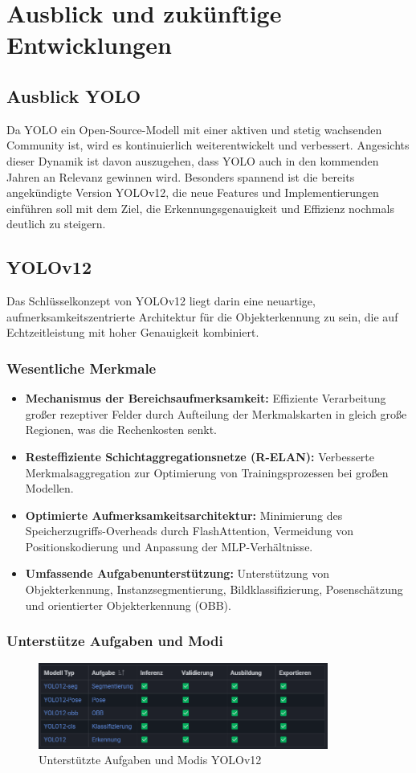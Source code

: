 \section{Ausblick und zukünftige Entwicklungen}
\subsection{Ausblick YOLO}
Da YOLO ein Open-Source-Modell mit einer aktiven und stetig wachsenden Community ist, wird es kontinuierlich weiterentwickelt und verbessert. Angesichts dieser Dynamik ist davon auszugehen, dass YOLO auch in den kommenden Jahren an Relevanz gewinnen wird. Besonders spannend ist die bereits angekündigte Version YOLOv12, die neue Features und Implementierungen einführen soll mit dem Ziel, die Erkennungsgenauigkeit und Effizienz nochmals deutlich zu steigern.
\subsection{YOLOv12}
Das Schlüsselkonzept von YOLOv12 liegt darin eine neuartige, aufmerksamkeitszentrierte Architektur für die Objekterkennung zu sein, die auf Echtzeitleistung mit hoher Genauigkeit kombiniert. \cite{Jocher2025YOLO12}
\subsubsection{Wesentliche Merkmale}
\begin{itemize}
    \item \textbf{Mechanismus der Bereichsaufmerksamkeit:} Effiziente Verarbeitung großer rezeptiver Felder durch Aufteilung der Merkmalskarten in gleich große Regionen, was die Rechenkosten senkt.
    \item \textbf{Resteffiziente Schichtaggregationsnetze (R-ELAN):} Verbesserte Merkmalsaggregation zur Optimierung von Trainingsprozessen bei großen Modellen.
    \item \textbf{Optimierte Aufmerksamkeitsarchitektur:} Minimierung des Speicherzugriffs-Overheads durch FlashAttention, Vermeidung von Positionskodierung und Anpassung der MLP-Verhältnisse.
    \item \textbf{Umfassende Aufgabenunterstützung:} Unterstützung von Objekterkennung, Instanzsegmentierung, Bildklassifizierung, Posenschätzung und orientierter Objekterkennung (OBB).
\end{itemize}
\subsubsection{Unterstütze Aufgaben und Modi}
\begin{figure}[ht]
    \centering
    \includegraphics[width=0.85\textwidth]{data/AufgabenUndModiYOLO12.png}
    \caption{Unterstützte Aufgaben und Modis YOLOv12}
    \label{fig:YOLOv12_unterstützte_Modi}
\end{figure}
